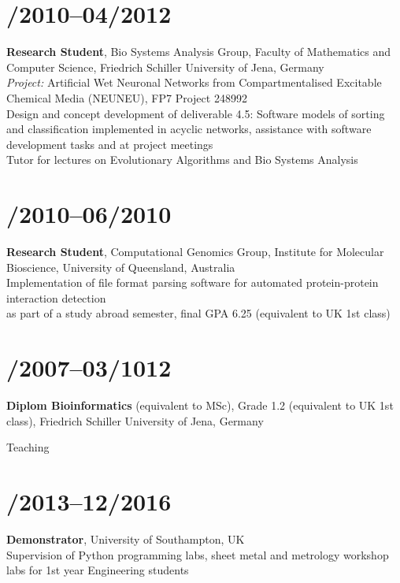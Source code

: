 \documentclass[margin,line,10pt]{res}
\begin{document}
\begin{resume}
\section{/2010--04/2012}{\bf Research Student}, Bio Systems Analysis Group, Faculty of Mathematics and Computer Science, Friedrich Schiller University of Jena, Germany\\
{\em Project:} Artificial Wet Neuronal Networks from Compartmentalised Excitable Chemical Media (NEUNEU), FP7 Project 248992\\
Design and concept development of deliverable 4.5: Software models of sorting and classification implemented in acyclic networks, assistance with software development tasks and at project meetings\\
Tutor for lectures on Evolutionary Algorithms and Bio Systems Analysis\\
\vspace*{-.35in}
\section{/2010--06/2010}{\bf Research Student}, Computational Genomics Group, Institute for Molecular Bioscience, University of Queensland, Australia\\
Implementation of file format parsing software for automated protein-protein interaction detection\\
as part of a study abroad semester, final GPA 6.25 (equivalent to UK 1st class)\\
\vspace*{-.35in}
\section{/2007--03/1012}{\bf Diplom Bioinformatics} (equivalent to MSc), Grade 1.2 (equivalent to UK 1st class), Friedrich Schiller University of Jena, Germany\\ 

\vspace*{-.2in}

{\sc Teaching}\\
\vspace*{-.35in}
\section{/2013--12/2016}{\bf Demonstrator}, University of Southampton, UK\\
Supervision of Python programming labs, sheet metal and metrology workshop labs for 1st year Engineering students\\
\vspace*{-.35in}

\end{resume}
\end{document}

